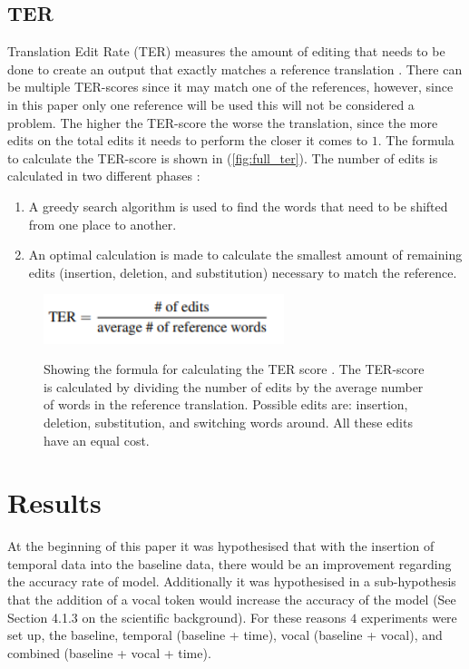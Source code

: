 \subsection{TER}

Translation Edit Rate (TER) measures the amount of editing that needs to be done to create an output that exactly matches a reference translation \cite{TERsnover2006}. There can be multiple TER-scores since it may match one of the references, however, since in this paper only one reference will be used this will not be considered a problem. The higher the TER-score the worse the translation, since the more edits on the total edits it needs to perform the closer it comes to $1$. The formula to calculate the TER-score is shown in (\autoref{fig:full_ter}). The number of edits is calculated in two different phases \cite{shapira2002edit}:
\begin{enumerate}
    \item A greedy search algorithm is used to find the words that need to be shifted from one place to another.
    \item An optimal calculation is made to calculate the smallest amount of remaining edits (insertion, deletion, and substitution) necessary to match the reference.
\end{enumerate}



\begin{figure}[h]
 \caption{Showing the formula for calculating the TER score \cite{TERsnover2006}. The TER-score is calculated by dividing the number of edits by the average number of words in the reference translation. Possible edits are: insertion, deletion, substitution, and switching words around. All these edits have an equal cost.}
 \centering 
 \includegraphics[width=7cm]{Bachelor CSAI thesis template/images/ter_formula.PNG}
 \label{fig:full_ter}
\end{figure}



\section{Results}

At the beginning of this paper it was hypothesised that with the insertion of temporal data into the baseline data, there would be an improvement regarding the accuracy rate of model. Additionally it was hypothesised in a sub-hypothesis that the addition of a vocal token would increase the accuracy of the model (See Section 4.1.3 on the scientific background). For these reasons $4$ experiments were set up, the baseline, temporal (baseline + time), vocal (baseline + vocal), and combined (baseline + vocal + time). 

